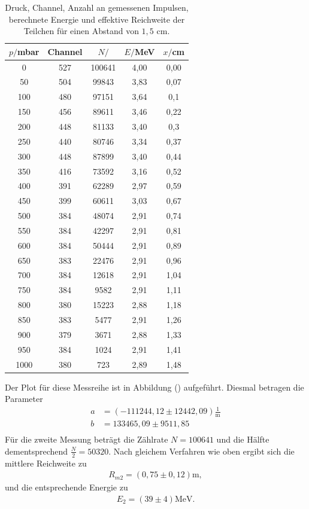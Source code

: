 \begin{table}[H]
  \centering
  \caption{Druck, Channel, Anzahl an gemessenen Impulsen, berechnete Energie und effektive Reichweite der Teilchen für einen Abstand von $1,5$ $\si{\cm}$.}
  \label{tab:Parameter}
  \begin{tabular}{c c c c c}
    \toprule
    $p/$mbar& Channel & $N/$ & $E/$MeV & $x/$cm \\
    \bottomrule
    0 & 527 & 100641 & 4,00 & 0,00 \\
    50 & 504 & 99843 & 3,83 & 0,07 \\
    100 & 480 & 97151 & 3,64 & 0,1 \\
    150 & 456 & 89611 & 3,46 & 0,22 \\
    200 & 448 & 81133 & 3,40 & 0,3 \\
    250 & 440 & 80746 & 3,34 & 0,37 \\
    300 & 448 &87899 & 3,40 & 0,44 \\
    350 & 416 & 73592 & 3,16 & 0,52 \\
    400 & 391 & 62289 & 2,97 & 0,59 \\
    450 & 399 & 60611 & 3,03 & 0,67 \\
    500 & 384 & 48074 & 2,91 & 0,74 \\
    550 & 384 & 42297 & 2,91 & 0,81 \\
    600 & 384 & 50444 & 2,91 & 0,89 \\
    650 & 383 & 22476 & 2,91 & 0,96 \\
    700 & 384 & 12618 & 2,91 & 1,04 \\
    750 & 384 & 9582 & 2,91 & 1,11 \\
    800 & 380 & 15223 & 2,88 & 1,18 \\
    850 & 383 & 5477 & 2,91 & 1,26 \\
    900 & 379 & 3671 & 2,88 & 1,33 \\
    950 & 384 & 1024 & 2,91 & 1,41 \\
    1000 & 380 & 723 & 2,89 & 1,48 \\

     \bottomrule
  \end{tabular}
\end{table}
\noindent Der Plot für diese Messreihe ist in Abbildung () aufgeführt. Diesmal betragen die Parameter
\begin{align*}
a &=  (-111244,12 \pm 12442,09) \frac{1}{\si{\meter}}\\
b &= 133465,09 \pm 9511,85 \\
\end{align*}
Für die zweite Messung beträgt die Zählrate $N=100641$ und die Hälfte dementsprechend $\frac{N}{2}=50320$. 
Nach gleichem Verfahren wie oben ergibt sich die mittlere Reichweite zu
\begin{align*}
R_{m2} = (0,75 \pm 0,12) \si{\meter},
\end{align*}
und die entsprechende Energie zu
\begin{align*}
E_{2} = (39 \pm 4) \si{\MeV}.
\end{align*}

